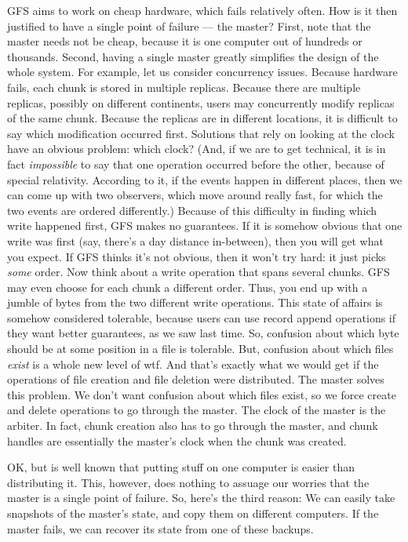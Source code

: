 GFS aims to work on cheap hardware, which fails relatively often.
How is it then justified to have a single point of failure --- the master?
First,
  note that the master needs not be cheap,
  because it is one computer out of hundreds or thousands.
Second,
  having a single master greatly simplifies the design of the whole system.
For example, let us consider concurrency issues.
Because hardware fails,
  each chunk is stored in multiple replicas.
Because there are multiple replicas,
  possibly on different continents,
  users may concurrently modify replicas of the same chunk.
Because the replicas are in different locations,
  it is difficult to say which modification occurred first.
Solutions that rely on looking at the clock have an obvious problem:
  which clock?
(And, if we are to get technical, it is in fact \emph{impossible}
  to say that one operation occurred before the other, because of special relativity.
According to it, if the events happen in different places,
  then we can come up with two observers, which move around really fast,
  for which the two events are ordered differently.)
Because of this difficulty in finding which write happened first,
  GFS makes no guarantees.
If it is somehow obvious that one write was first
  (say, there's a day distance in-between),
  then you will get what you expect.
If GFS thinks it's not obvious, then it won't try hard:
  it just picks \emph{some} order.
Now think about a write operation that spans several chunks.
GFS may even choose for each chunk a different order.
Thus, you end up with a jumble of bytes from the two different write operations.
This state of affairs is somehow considered tolerable,
  because users can use record append operations if they want better guarantees,
  as we saw last time.
So, confusion about which byte should be at some position in a file is tolerable.
But, confusion about which files \emph{exist} is a whole new level of wtf.
And that's exactly what we would get
  if the operations of file creation and file deletion were distributed.
The master solves this problem.
We don't want confusion about which files exist,
  so we force create and delete operations to go through the master.
The clock of the master is the arbiter.
In fact,
  chunk creation also has to go through the master,
  and chunk handles are essentially the master's clock when the chunk was created.

OK, but is well known that putting stuff on one computer
  is easier than distributing it.
This, however, does nothing to assuage our worries that the master
  is a single point of failure.
So, here's the third reason:
  We can easily take snapshots of the master's state,
  and copy them on different computers.
If the master fails, we can recover its state from one of these backups.

